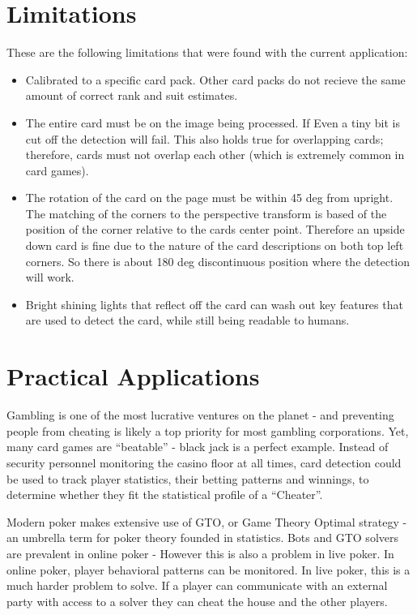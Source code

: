 \documentclass[conference]{IEEEtran}
\begin{document}
\section{Limitations}
These are the following limitations that were found with the current application:
\begin{itemize}
\item Calibrated to a specific card pack. Other card packs do not recieve the same amount of correct
        rank and suit estimates.
\item The entire card must be on the image being processed. If Even a tiny bit is cut off the
        detection will fail. This also holds true for overlapping cards; therefore, cards must not
        overlap each other (which is extremely common in card games).
\item The rotation of the card on the page must be within 45 deg from upright. The matching of the
        corners to the perspective transform is based of the position of the corner relative to the
        cards center point. Therefore an upside down card is fine due to the nature of the card
        descriptions on both top left corners. So there is about 180 deg discontinuous position
        where the detection will work.
\item Bright shining lights that reflect off the card can wash out key features that are used to
        detect the card, while still being readable to humans.
\end{itemize}

\section{Practical Applications}
Gambling is one of the most lucrative ventures on the planet - and preventing people from cheating
is likely a top priority for most gambling corporations. Yet, many card games are ``beatable'' - black
jack is a perfect example. Instead of security personnel monitoring the casino floor at all times,
card detection could be used to track player statistics, their betting patterns and winnings, to
determine whether they fit the statistical profile of a ``Cheater''.

Modern poker makes extensive use of GTO, or Game Theory Optimal strategy - an umbrella term for
poker theory founded in statistics. Bots and GTO solvers are prevalent in online poker - However
this is also a problem in live poker. In online poker, player behavioral patterns can be monitored.
In live poker, this is a much harder problem to solve. If a player can communicate with an external
party with access to a solver they can cheat the house and the other players.
\end{document}
